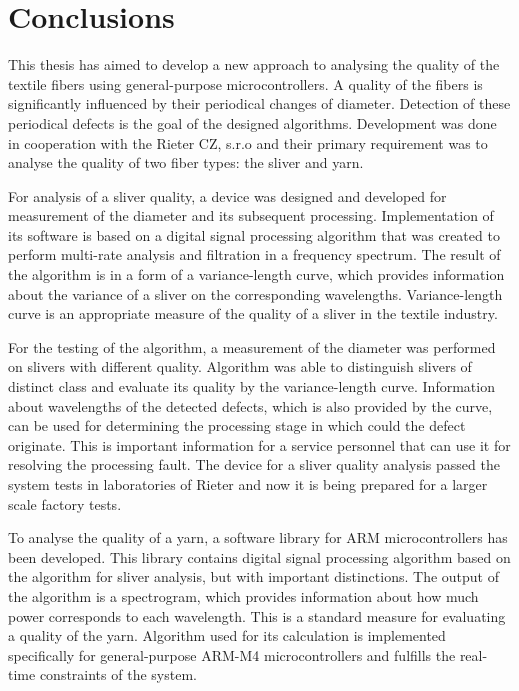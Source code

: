 \documentclass[twoside]{ctuthesis}
\theoremstyle{plain}
\theoremstyle{definition}
\theoremstyle{note}
\begin{document}
\chapter{Conclusions}
This thesis has aimed to develop a new approach to analysing the quality of the textile fibers using general-purpose microcontrollers. A quality of the fibers is significantly influenced by their periodical changes of diameter. Detection of these periodical defects is the goal of the designed algorithms. Development was done in cooperation with the Rieter CZ, s.r.o and their primary requirement was to analyse the quality of two fiber types: the sliver and yarn. 

For analysis of a sliver quality, a device was designed and developed for measurement of the diameter and its subsequent processing. Implementation of its software is based on a digital signal processing algorithm that was created to perform multi-rate analysis and filtration in a frequency spectrum. The result of the algorithm is in a form of a variance-length curve, which provides information about the variance of a sliver on the corresponding wavelengths. Variance-length curve is an appropriate measure of the quality of a sliver in the textile industry.

For the testing of the algorithm, a measurement of the diameter was performed on slivers with different quality. Algorithm was able to distinguish slivers of distinct class and evaluate its quality by the variance-length curve. Information about wavelengths of the detected defects, which is also provided by the curve, can be used for determining the processing stage in which could the defect originate. This is important information for a service personnel that can use it for resolving the processing fault. The device for a sliver quality analysis passed the system tests in laboratories of Rieter and now it is being prepared for a larger scale factory tests.

To analyse the quality of a yarn, a software library for ARM microcontrollers has been developed. This library contains digital signal processing algorithm based on the algorithm for sliver analysis, but with important distinctions. The output of the algorithm is a spectrogram, which provides information about how much power corresponds to each wavelength. This is a standard measure for evaluating a quality of the yarn. Algorithm used for its calculation is implemented specifically for general-purpose ARM-M4 microcontrollers and fulfills the real-time constraints of the system.
\end{document}
